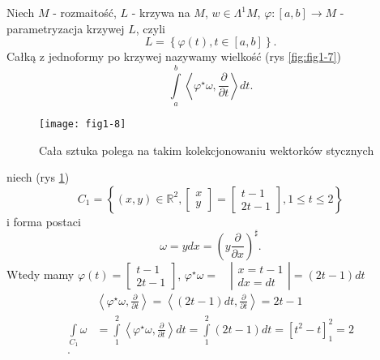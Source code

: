 \documentclass[../main.tex]{subfiles}
\begin{document}
\pagebreak
\begin{definicja}
    Niech $M$ - rozmaitość, $L$ - krzywa na $M$, $w\in \Lambda^1M$, $\varphi: [a,b] \to M$ - parametryzacja krzywej $L$, czyli
    \[
        L = \left\{ \varphi(t), t\in [a,b] \right\}
    .\]
Całką z jednoformy po krzywej nazywamy wielkość (rys \ref{fig:fig1-7})
\[
\int\limits_a^b \left<\varphi^\star \omega, \frac{\partial }{\partial t}  \right>dt
.\]
\end{definicja}
\begin{figure}[h]
    \centering
    \texttt{[image: fig1-8]}
    \caption{Cała sztuka polega na takim kolekcjonowaniu wektorków stycznych}
    \label{fig:fig1-8}
\end{figure}
\begin{przyklad}
    niech (rys \ref{fig:fig1-8})
 \[
     C_1 = \left\{ (x,y)\in \mathbb{R}^2, \begin{bmatrix} x\\y \end{bmatrix} = \begin{bmatrix} t-1\\2t-1 \end{bmatrix}, 1\le t\le 2 \right\}
\]
i forma postaci
    \[
        \omega = ydx = \left( y \frac{\partial }{\partial x}  \right)^\sharp
    .\]
Wtedy mamy $\varphi(t) = \begin{bmatrix} t-1\\2t-1 \end{bmatrix} $, $\varphi^\star \omega =\quad \left| \begin{matrix}x=t-1\\dx = dt\end{matrix}\right| = (2t-1)dt$
    \begin{align*}
        &\left<\varphi^\star \omega, \frac{\partial }{\partial t}  \right> = \left<(2t-1)dt, \frac{\partial }{\partial t}  \right> = 2t-1\\
        \int\limits_{C_1}\omega &= \int\limits_1^2\left<\varphi^\star\omega, \frac{\partial }{\partial t}  \right>dt = \int\limits_1^2 (2t-1)dt = \left[ t^2 - t \right]_1^2 =  2\\
    .\end{align*}


\end{przyklad}
\end{document}
